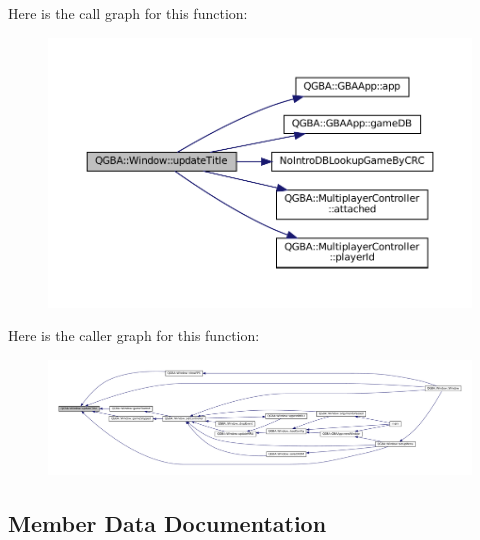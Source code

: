 Here is the call graph for this function\+:
\nopagebreak
\begin{figure}[H]
\begin{center}
\leavevmode
\includegraphics[width=350pt]{class_q_g_b_a_1_1_window_afdf62686722f2d43b8efc1932f545f5a_cgraph}
\end{center}
\end{figure}
Here is the caller graph for this function\+:
\nopagebreak
\begin{figure}[H]
\begin{center}
\leavevmode
\includegraphics[width=350pt]{class_q_g_b_a_1_1_window_afdf62686722f2d43b8efc1932f545f5a_icgraph}
\end{center}
\end{figure}


\subsection{Member Data Documentation}
\mbox{\label{class_q_g_b_a_1_1_window_a3429e7b95854ae5e646481d4a933ca04}} 

